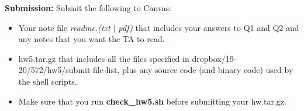 \documentclass[11pt]{article}
\begin{document}
\vspace{0.2 in}
\noindent

{\bf Submission:}  Submit the following to Canvas:
\begin{itemize}
  \item Your note file {\it readme.(txt $\mid$ pdf)}
        that includes your answers to Q1 and Q2 and any notes that you want the TA to read.
      

  \item  hw5.tar.gz that includes all the files specified in
      dropbox/19-20/572/hw5/submit-file-list, plus any source code
      (and binary code) used by the shell scripts.

  \item Make sure that you run {\bf check\_hw5.sh} before
    submitting your hw.tar.gz.

\end{itemize}
\end{document}
